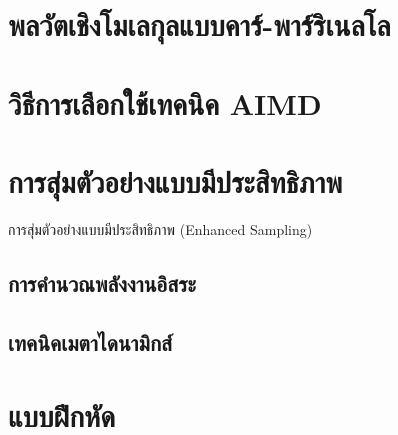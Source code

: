 \section{พลวัตเชิงโมเลกุลแบบคาร์-พาร์ริเนลโล}

\section{วิธีการเลือกใช้เทคนิค AIMD}

\section{การสุ่มตัวอย่างแบบมีประสิทธิภาพ}

การสุ่มตัวอย่างแบบมีประสิทธิภาพ (Enhanced Sampling)

\subsection{การคำนวณพลังงานอิสระ}

\subsection{เทคนิคเมตาไดนามิกส์}

\section{แบบฝึกหัด}
